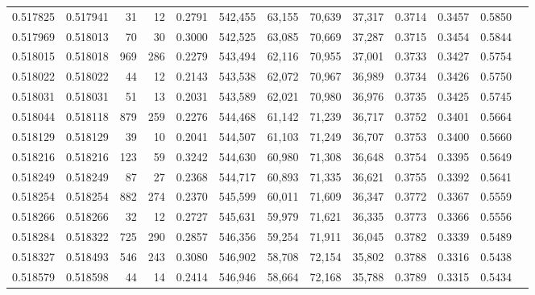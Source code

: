 \begin{tabular}{rrrrrrrrrrrrr}
0.517825 & 0.517941 &    31 &    12 &                                     0.2791 & 542,455 &  63,155 &  70,639 &  37,317 & 0.3714 & 0.3457 & 0.5850 \\
0.517969 & 0.518013 &    70 &    30 &                                     0.3000 & 542,525 &  63,085 &  70,669 &  37,287 & 0.3715 & 0.3454 & 0.5844 \\
0.518015 & 0.518018 &   969 &   286 &                                     0.2279 & 543,494 &  62,116 &  70,955 &  37,001 & 0.3733 & 0.3427 & 0.5754 \\
0.518022 & 0.518022 &    44 &    12 &                                     0.2143 & 543,538 &  62,072 &  70,967 &  36,989 & 0.3734 & 0.3426 & 0.5750 \\
0.518031 & 0.518031 &    51 &    13 &                                     0.2031 & 543,589 &  62,021 &  70,980 &  36,976 & 0.3735 & 0.3425 & 0.5745 \\
0.518044 & 0.518118 &   879 &   259 &                                     0.2276 & 544,468 &  61,142 &  71,239 &  36,717 & 0.3752 & 0.3401 & 0.5664 \\
0.518129 & 0.518129 &    39 &    10 &                                     0.2041 & 544,507 &  61,103 &  71,249 &  36,707 & 0.3753 & 0.3400 & 0.5660 \\
0.518216 & 0.518216 &   123 &    59 &                                     0.3242 & 544,630 &  60,980 &  71,308 &  36,648 & 0.3754 & 0.3395 & 0.5649 \\
0.518249 & 0.518249 &    87 &    27 &                                     0.2368 & 544,717 &  60,893 &  71,335 &  36,621 & 0.3755 & 0.3392 & 0.5641 \\
0.518254 & 0.518254 &   882 &   274 &                                     0.2370 & 545,599 &  60,011 &  71,609 &  36,347 & 0.3772 & 0.3367 & 0.5559 \\
0.518266 & 0.518266 &    32 &    12 &                                     0.2727 & 545,631 &  59,979 &  71,621 &  36,335 & 0.3773 & 0.3366 & 0.5556 \\
0.518284 & 0.518322 &   725 &   290 &                                     0.2857 & 546,356 &  59,254 &  71,911 &  36,045 & 0.3782 & 0.3339 & 0.5489 \\
0.518327 & 0.518493 &   546 &   243 &                                     0.3080 & 546,902 &  58,708 &  72,154 &  35,802 & 0.3788 & 0.3316 & 0.5438 \\
0.518579 & 0.518598 &    44 &    14 &                                     0.2414 & 546,946 &  58,664 &  72,168 &  35,788 & 0.3789 & 0.3315 & 0.5434 \\

\end{tabular}
